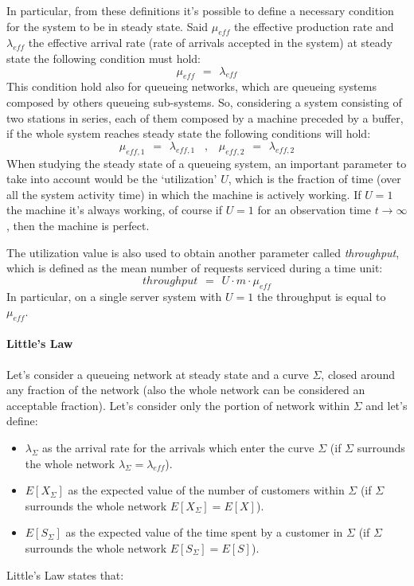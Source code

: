 \documentclass[12pt,a4paper]{article}
\begin{document}
\bigskip\noindent
In particular, from these definitions it's possible to define a necessary condition for the system to be in steady state. Said $\mu_{eff}$ the effective production rate and $\lambda_{eff}$ the effective arrival rate (rate of arrivals accepted in the system) at steady state the following condition must hold:
$$
\mu_{eff}\hspace{5pt}=\hspace{5pt}\lambda_{eff}
$$
This condition hold also for queueing networks, which are queueing systems composed by others queueing sub-systems. So, considering a system consisting of two stations in series, each of them composed by a machine preceded by a buffer, if the whole system reaches steady state the following conditions will hold:
$$
\mu_{eff,1}\hspace{5pt}=\hspace{5pt}\lambda_{eff,1}
\hspace{10pt}
,
\hspace{10pt}
\mu_{eff,2}\hspace{5pt}=\hspace{5pt}\lambda_{eff,2}
$$
When studying the steady state of a queueing system, an important parameter to take into account would be the `utilization' $U$, which is the fraction of time (over all the system activity time) in which the machine is actively working. If $U=1$ the machine it's always working, of course if $U=1$ for an observation time $t\rightarrow \infty$, then the machine is perfect. 

\bigskip\noindent
The utilization value is also used to obtain another parameter called \emph{throughput}, which is defined as the mean number of requests serviced during a time unit:
$$
throughput\hspace{5pt}=\hspace{5pt}U\cdot m\cdot \mu_{eff}
$$
In particular, on a single server system with $U=1$ the throughput is equal to $\mu_{eff}$.
\newpage

\paragraph{Little's Law}
Let's consider a queueing network at steady state and a curve $\Sigma$, closed around any fraction of the network (also the whole network can be considered an acceptable fraction). Let's consider only the portion of network within $\Sigma$ and let's define:
\begin{itemize}
\item $\lambda_{\Sigma}$ as the arrival rate for the arrivals which enter the curve $\Sigma$ (if $\Sigma$ surrounds the whole network $\lambda_{\Sigma}=\lambda_{eff}$).
\item $E[X_{\Sigma}]$ as the expected value of the number of customers within $\Sigma$ (if $\Sigma$ surrounds the whole network $E[X_{\Sigma}]=E[X]$).
\item $E[S_{\Sigma}]$ as the expected value of the time spent by a customer in $\Sigma$ (if $\Sigma$ surrounds the whole network $E[S_{\Sigma}]=E[S]$).
\end{itemize}
Little's Law states that:
\end{document}
